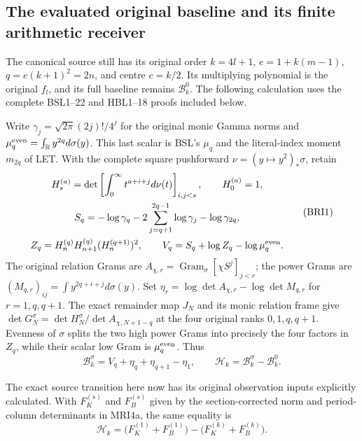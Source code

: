 \documentclass[11pt,a4paper]{article}
\begin{document}
\subsection{The evaluated original baseline and its finite arithmetic receiver}

The canonical source still has its original order $k=4l+1$,
$e=1+k(m-1)$, $q=e(k+1)^2=2n$, and centre $c=k/2$.
Its multiplying polynomial is the original $f_l$, and its full
baseline remains $\mathcal B_k^0$. The following calculation uses
the complete BSL1--22 and HBL1--18 proofs included below.

Write $\gamma_j=\sqrt{2\pi}(2j)!/4^j$ for the original monic
Gamma norms and $\mu_q^{\rm even}=\int_{\mathbb R}y^{2q}d\sigma(y)$.
This last scalar is BSL's $\mu_q$ and the literal-index moment
$m_{2q}$ of LET. With the complete square pushforward
$\nu=(y\mapsto y^2)_*\sigma$, retain
\[
\begin{gathered}
 H_s^{(a)}=\det\left[\int_0^\infty t^{a+i+j}d\nu(t)\right]_{i,j<s},
 \qquad H_0^{(a)}=1,\\
 S_q=-\log\gamma_q-2\sum_{j=q+1}^{2q-1}\log\gamma_j
                                             -\log\gamma_{2q},\\
 Z_q=H_n^{(q)}H_{n+1}^{(q)}(H_n^{(q+1)})^2,
 \qquad V_q=S_q+\log Z_q-\log\mu_q^{\rm even}.
\end{gathered}\tag{BRI1}
\]
The original relation Grams are
$A_{\chi,r}=\operatorname{Gram}_\sigma[\chi S^j]_{j<r}$;
the power Grams are
$(M_{q,r})_{ij}=\int y^{2q+i+j}d\sigma(y)$.
Set $\eta_r=\log\det A_{\chi,r}-\log\det M_{q,r}$ for
$r=1,q,q+1$. The exact remainder map $J_N$ and its monic
relation frame give $\det G_N^\sigma=\det H_N^\sigma/
\det A_{\chi,N+1-q}$ at the four original ranks $0,1,q,q+1$.
Evenness of $\sigma$ splits the two high power Grams into precisely
the four factors in $Z_q$, while their scalar low Gram is
$\mu_q^{\rm even}$. Thus
\[
 \mathcal B_k^\sigma=V_q+\eta_q+\eta_{q+1}-\eta_1,
 \qquad \mathcal H_k=\mathcal B_k^\sigma-\mathcal B_k^0.
 \tag{BRI2}
\]

The exact source transition here now has its original observation
inputs explicitly calculated. With $F_K^{(s)}$ and $F_B^{(s)}$
given by the section-corrected norm and period-column determinants
in MRI4a, the same equality is
\[
 \mathcal H_k
   =\bigl(F_K^{(1)}+F_B^{(1)}\bigr)
       -\bigl(F_K^{(k)}+F_B^{(k)}\bigr).
 \tag{BRI2a}
\]
\end{document}
